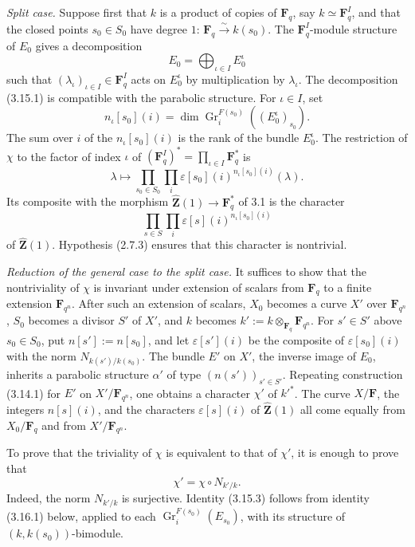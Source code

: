 \documentclass[11pt]{article}
\newcommand{\Fq}{\mathbf{F}_q}
\newcommand{\Fqn}{\mathbf{F}_{q^n}}
\newcommand{\F}{\mathbf{F}}
\newcommand{\Zhat}{\widehat{\mathbf{Z}}}
\newcommand{\Gr}{\operatorname{Gr}}
\begin{document}
\textit{Split case.} Suppose first that \(k\) is a product of copies of \(\Fq\), say \(k\simeq\Fq^I\), and that the closed points \(s_0\in S_0\) have degree \(1\): \(\Fq\xrightarrow{\sim}k(s_0)\). The \(\Fq^I\)-module structure of \(E_0\) gives a decomposition
\begin{equation}
  E_0=\bigoplus_{\iota\in I}E_0^{\iota}
\tag{3.15.1}
\end{equation}
such that \((\lambda_\iota)_{\iota\in I}\in\Fq^I\) acts on \(E_0^\iota\) by multiplication by \(\lambda_\iota\). The decomposition (3.15.1) is compatible with the parabolic structure. For \(\iota\in I\), set
\[
  n_\iota[s_0](i)=\dim\Gr_i^{F(s_0)}((E_0^\iota)_{s_0}).
\]
The sum over \(i\) of the \(n_\iota[s_0](i)\) is the rank of the bundle \(E_0^\iota\). The restriction of \(\chi\) to the factor of index \(\iota\) of \((\Fq^I)^*=\prod_{\iota\in I}\Fq^*\) is
\begin{equation}
  \lambda\longmapsto\prod_{s_0\in S_0}\prod_i\varepsilon[s_0](i)^{n_\iota[s_0](i)}(\lambda).
\tag{3.15.2}
\end{equation}
Its composite with the morphism \(\Zhat(1)\to\Fq^*\) of 3.1 is the character
\[
  \prod_{s\in S}\prod_i\varepsilon[s](i)^{n_\iota[s_0](i)}
\]
of \(\Zhat(1)\). Hypothesis (2.7.3) ensures that this character is nontrivial.

\textit{Reduction of the general case to the split case.} It suffices to show that the nontriviality of \(\chi\) is invariant under extension of scalars from \(\Fq\) to a finite extension \(\Fqn\). After such an extension of scalars, \(X_0\) becomes a curve \(X'\) over \(\Fqn\), \(S_0\) becomes a divisor \(S'\) of \(X'\), and \(k\) becomes \(k':=k\otimes_{\Fq}\Fqn\). For \(s'\in S'\) above \(s_0\in S_0\), put \(n[s']:=n[s_0]\), and let \(\varepsilon[s'](i)\) be the composite of \(\varepsilon[s_0](i)\) with the norm \(N_{k(s')/k(s_0)}\). The bundle \(E'\) on \(X'\), the inverse image of \(E_0\), inherits a parabolic structure \(\alpha'\) of type \((n(s'))_{s'\in S'}\). Repeating construction (3.14.1) for \(E'\) on \(X'/\Fqn\), one obtains a character \(\chi'\) of \(k'^*\). The curve \(X/\F\), the integers \(n[s](i)\), and the characters \(\varepsilon[s](i)\) of \(\Zhat(1)\) all come equally from \(X_0/\Fq\) and from \(X'/\Fqn\).

To prove that the triviality of \(\chi\) is equivalent to that of \(\chi'\), it is enough to prove that
\begin{equation}
  \chi'=\chi\circ N_{k'/k}.
\tag{3.15.3}
\end{equation}
Indeed, the norm \(N_{k'/k}\) is surjective. Identity (3.15.3) follows from identity (3.16.1) below, applied to each \(\Gr_i^{F(s_0)}(E_{s_0})\), with its structure of \((k,k(s_0))\)-bimodule.
\end{document}
